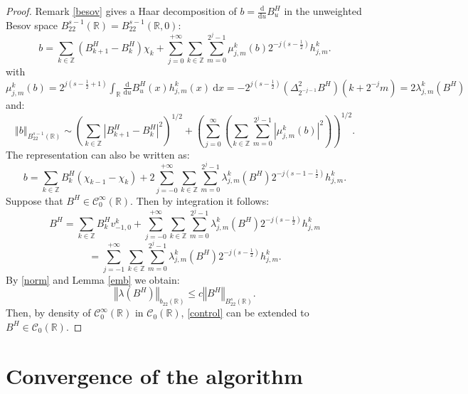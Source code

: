 \documentclass[11pt]{enstaPRE}
\newcommand{\de}[2]{\frac{\mathrm{d} #1}{\mathrm{d} #2}}
\newcommand{\norme}[1]{\left\Vert #1\right\Vert}
\newcommand{\R}{\mathbb{R}}
\newcommand{\Z}{\mathbb{Z}}
\newcommand{\di}{\mathrm{d}}
\begin{document}
\begin{proof}
    Remark \ref{besov} gives a Haar decomposition of $b=\de{}{u} B^H_u$ in the unweighted Besov space $B^{s-1}_{22}(\R)=B^{s-1}_{22}(\R,0)$:
    \begin{equation}
    b =\sum_{k\in\Z}\left(B^H_{k+1}-B^H_k\right)\chi_k +\sum_{j=0}^{+\infty}\sum_{k\in\Z}\sum_{m=0}^{2^j-1}\mu_{j,m}^k(b)2^{-j\left(s-\frac{1}{2}\right)}h_{j,m}^k.
    \end{equation}
    with $\mu^k_{j,m}(b)= 2^{j\left(s-\frac{1}{2}+1\right)}\int_{\R}\de{}{u} B^H_u(x)h_{j,m}^k(x)\ \di x=-2^{j\left(s-\frac{1}{2}\right)} \left(\Delta^2_{2^{-j-1}}B^H\right)(k+2^{-j}m)=2\lambda^k_{j,m}(B^H)$ and:
    \begin{equation}\label{norm}
    \norme{b}_{B^{s-1}_{22}(\R)} \sim \left(\sum_{k\in\Z}\left|B^H_{k+1}-B^H_k\right|^2\right)^{1/2} + \left(\sum_{j=0}^\infty\left(\sum_{k\in\Z}\sum_{m=0}^{2^j-1}\left|\mu_{j,m}^k(b)\right|^2\right)\right)^{1/2}.
    \end{equation}    
    The representation can also be written as:
    \begin{equation*}
    b = \sum_{k\in\Z} B^H_k(\chi_{k-1}-\chi_k) + 2\sum_{j=-0}^{+\infty}\sum_{k\in\Z}\sum_{m=0}^{2^j-1}\lambda_{j,m}^k\left(B^H\right)2^{-j\left(s-1-\frac{1}{2}\right)}h_{j,m}^k.
    \end{equation*}
    Suppose that $B^H\in\mathcal{C}^\infty_0(\R)$. Then by integration it follows:
     \begin{equation*}
    B^H = \sum_{k\in\Z} B^H_k v^k_{-1,0} + \sum_{j=-0}^{+\infty}\sum_{k\in\Z}\sum_{m=0}^{2^j-1}\lambda_{j,m}^k\left(B^H\right)2^{-j\left(s-\frac{1}{2}\right)}h_{j,m}^k
    \end{equation*}
     \begin{equation}\label{rep}
    =\sum_{j=-1}^{+\infty}\sum_{k\in\Z}\sum_{m=0}^{2^j-1}\lambda_{j,m}^k\left(B^H\right)2^{-j\left(s-\frac{1}{2}\right)}h_{j,m}^k.
    \end{equation}    
By \ref{norm} and Lemma \ref{emb} we obtain:
\begin{equation}\label{control}
\norme{\lambda(B^H)}_{b_{22}(\R)} \leq c\norme{B^H}_{B^s_{22}(\R)}.
\end{equation}
Then, by density of $\mathcal{C}^\infty_0(\R)$ in $\mathcal{C}_0
(\R)$, \ref{control} can be extended to $B^H\in\mathcal{C}_0
(\R)$. 

\end{proof}

\part{Convergence of the algorithm}
\end{document}
